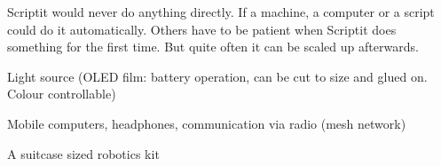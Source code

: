 \begin{npcBox}[title=Scriptit - a Pioneer Automationationeer]
    \begin{stressSection}
    \end{stressSection}
    \begin{tabularx}{\textwidth}{ XX }
    \end{tabularx}

    \begin{consequences}
    \item {}
    \item {}
    \item {}
    \end{consequences}

    \begin{npcDescription}
    Scriptit would never do anything directly. If a machine, a computer or a script could do it automatically. Others have to be patient when Scriptit does something for the first time. But quite often it can be scaled up afterwards.

    \end{npcDescription}

    \begin{equipment}
        \item Light source (OLED film: battery operation, can be cut to size and glued on. Colour controllable)
        \item Mobile computers, headphones, communication via radio (mesh network)
        \item A suitcase sized robotics kit
    \end{equipment}
\end{npcBox}
